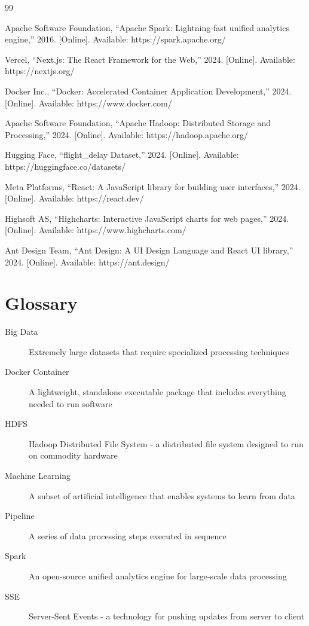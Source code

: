 \documentclass[12pt,a4paper]{report}
\begin{document}
\begin{thebibliography}{99}

Apache Software Foundation, ``Apache Spark: Lightning-fast unified analytics engine,'' 2016. [Online]. Available: https://spark.apache.org/

Vercel, ``Next.js: The React Framework for the Web,'' 2024. [Online]. Available: https://nextjs.org/

Docker Inc., ``Docker: Accelerated Container Application Development,'' 2024. [Online]. Available: https://www.docker.com/

Apache Software Foundation, ``Apache Hadoop: Distributed Storage and Processing,'' 2024. [Online]. Available: https://hadoop.apache.org/

Hugging Face, ``flight\_delay Dataset,'' 2024. [Online]. Available: https://huggingface.co/datasets/

Meta Platforms, ``React: A JavaScript library for building user interfaces,'' 2024. [Online]. Available: https://react.dev/

Highsoft AS, ``Highcharts: Interactive JavaScript charts for web pages,'' 2024. [Online]. Available: https://www.highcharts.com/

Ant Design Team, ``Ant Design: A UI Design Language and React UI library,'' 2024. [Online]. Available: https://ant.design/

\end{thebibliography}

\appendix

\chapter{Glossary}

\begin{description}
    \item[Big Data] Extremely large datasets that require specialized processing techniques
    \item[Docker Container] A lightweight, standalone executable package that includes everything needed to run software
    \item[HDFS] Hadoop Distributed File System - a distributed file system designed to run on commodity hardware
    \item[Machine Learning] A subset of artificial intelligence that enables systems to learn from data
    \item[Pipeline] A series of data processing steps executed in sequence
    \item[Spark] An open-source unified analytics engine for large-scale data processing
    \item[SSE] Server-Sent Events - a technology for pushing updates from server to client
\end{description}
\end{document}
